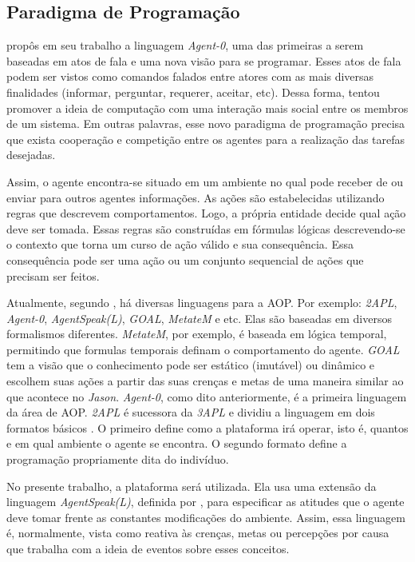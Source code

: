 \subsection{Paradigma de Programação} \label{sec:aoppp}

\citet{shoham1993agent} propôs em seu trabalho a linguagem \emph{Agent-0}, uma
das primeiras a serem baseadas em atos de fala e uma nova visão para se
programar.  Esses atos de fala podem ser vistos como comandos falados entre
atores com as mais diversas finalidades (informar, perguntar, requerer,
aceitar, etc).  Dessa forma,  tentou promover a
ideia de computação com uma interação mais social entre os membros de um sistema.
Em outras palavras, esse novo paradigma de programação precisa que exista
cooperação e competição entre os agentes para a realização das tarefas
desejadas.

Assim, o agente encontra-se situado em um ambiente no qual pode receber de ou
enviar para outros agentes informações. As ações são
estabelecidas utilizando regras que descrevem comportamentos. Logo, 
a própria entidade decide qual ação deve ser tomada. Essas regras
são construídas em fórmulas lógicas descrevendo-se o contexto que torna um
curso de ação válido e sua consequência. Essa consequência pode ser uma ação
ou um conjunto sequencial de ações que precisam ser feitos.

Atualmente, segundo \citet{bordini2009multi}, há diversas linguagens para a
AOP. Por exemplo: \emph{2APL}, \emph{Agent-0}, \emph{AgentSpeak(L)},
\emph{GOAL}, \emph{MetateM} e etc. Elas são baseadas em diversos
formalismos diferentes. \emph{MetateM}, por exemplo, é baseada em lógica temporal,
permitindo que formulas temporais definam o comportamento do agente.
\emph{GOAL} tem a visão que o conhecimento pode ser estático (imutável) ou
dinâmico e escolhem suas ações a partir das suas crenças e metas de uma
maneira similar ao que acontece no \emph{Jason}.
\emph{Agent-0}, como dito anteriormente, é a primeira linguagem da
área de AOP. \emph{2APL} é sucessora da \emph{3APL} e dividiu a linguagem em
dois formatos básicos \cite{dastani20082apl}. O primeiro define como a
plataforma irá operar, isto é, quantos e em qual ambiente o agente se
encontra. O segundo formato define a programação propriamente dita do indivíduo.

No presente trabalho, a plataforma \jason \cite{bordini-jason} será utilizada.
Ela usa uma extensão da linguagem \emph{AgentSpeak(L)}, definida por
\citet{rao1996agentspeak}, para especificar as atitudes que o agente deve
tomar frente as constantes modificações do ambiente. Assim, essa linguagem é,
normalmente, vista como reativa às crenças, metas ou percepções por causa que
trabalha com a ideia de eventos sobre esses conceitos.


